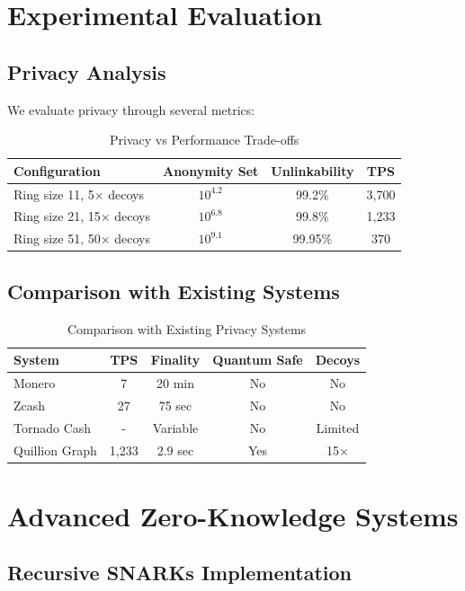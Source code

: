 \documentclass[12pt,a4paper]{article}
\begin{document}
\section{Experimental Evaluation}

\subsection{Privacy Analysis}

We evaluate privacy through several metrics:

\begin{table}[h]
\centering
\begin{tabular}{lccc}
\toprule
Configuration & Anonymity Set & Unlinkability & TPS \\
\midrule
Ring size 11, 5× decoys & $10^{4.2}$ & 99.2\% & 3,700 \\
Ring size 21, 15× decoys & $10^{6.8}$ & 99.8\% & 1,233 \\
Ring size 51, 50× decoys & $10^{9.1}$ & 99.95\% & 370 \\
\bottomrule
\end{tabular}
\caption{Privacy vs Performance Trade-offs}
\end{table}

\subsection{Comparison with Existing Systems}

\begin{table}[h]
\centering
\begin{tabular}{lcccc}
\toprule
System & TPS & Finality & Quantum Safe & Decoys \\
\midrule
Monero & 7 & 20 min & No & No \\
Zcash & 27 & 75 sec & No & No \\
Tornado Cash & - & Variable & No & Limited \\
Quillion Graph & 1,233 & 2.9 sec & Yes & 15× \\
\bottomrule
\end{tabular}
\caption{Comparison with Existing Privacy Systems}
\end{table}

\section{Advanced Zero-Knowledge Systems}

\subsection{Recursive SNARKs Implementation}
\end{document}
